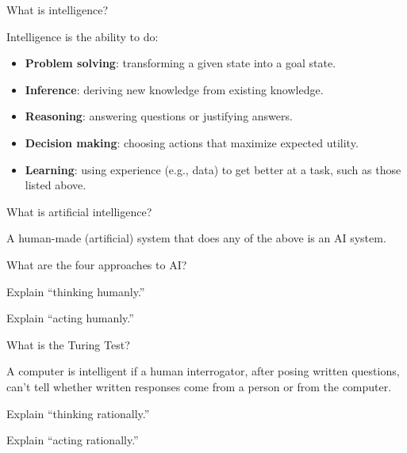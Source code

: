 \begin{questions}

\question What is intelligence?

\begin{solution}[1.5in]
Intelligence is the ability to do:

\begin{itemize}
\item {\bf Problem solving}: transforming a given state into a goal state.
\item {\bf Inference}: deriving new knowledge from existing knowledge.
\item {\bf Reasoning}: answering questions or justifying answers.
\item {\bf Decision making}: choosing actions that maximize expected utility.
\item {\bf Learning}: using experience (e.g., data) to get better at a task, such as those listed above.
\end{itemize}

\end{solution}

\question What is artificial intelligence?

\begin{solution}[1.5in]
A human-made (artificial) system that does any of the above is an AI system.
\end{solution}

\question What are the four approaches to AI?

\begin{solution}[2in]
\end{solution}

\newpage

\question Explain ``thinking humanly.''

\begin{solution}[1.5in]
\end{solution}

\question Explain ``acting humanly.''

\begin{solution}[1.5in]
\end{solution}

\question What is the Turing Test?

\begin{solution}[1.5in]
A computer is intelligent if a human interrogator, after posing written questions, can’t tell whether written responses come from a person or from the computer.
\end{solution}

\question Explain ``thinking rationally.''

\begin{solution}[1.5in]
\end{solution}

\question Explain ``acting rationally.''

\begin{solution}[1.5in]
\end{solution}

\end{questions}

